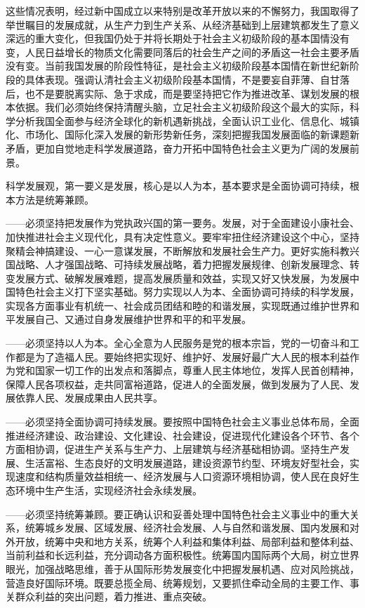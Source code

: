 这些情况表明，经过新中国成立以来特别是改革开放以来的不懈努力，我国取得了举世瞩目的发展成就，从生产力到生产关系、从经济基础到上层建筑都发生了意义深远的重大变化，但我国仍处于并将长期处于社会主义初级阶段的基本国情没有变，人民日益增长的物质文化需要同落后的社会生产之间的矛盾这一社会主要矛盾没有变。当前我国发展的阶段性特征，是社会主义初级阶段基本国情在新世纪新阶段的具体表现。强调认清社会主义初级阶段基本国情，不是要妄自菲薄、自甘落后，也不是要脱离实际、急于求成，而是要坚持把它作为推进改革、谋划发展的根本依据。我们必须始终保持清醒头脑，立足社会主义初级阶段这个最大的实际，科学分析我国全面参与经济全球化的新机遇新挑战，全面认识工业化、信息化、城镇化、市场化、国际化深入发展的新形势新任务，深刻把握我国发展面临的新课题新矛盾，更加自觉地走科学发展道路，奋力开拓中国特色社会主义更为广阔的发展前景。

科学发展观，第一要义是发展，核心是以人为本，基本要求是全面协调可持续，根本方法是统筹兼顾。

——必须坚持把发展作为党执政兴国的第一要务。发展，对于全面建设小康社会、加快推进社会主义现代化，具有决定性意义。要牢牢扭住经济建设这个中心，坚持聚精会神搞建设、一心一意谋发展，不断解放和发展社会生产力。更好实施科教兴国战略、人才强国战略、可持续发展战略，着力把握发展规律、创新发展理念、转变发展方式、破解发展难题，提高发展质量和效益，实现又好又快发展，为发展中国特色社会主义打下坚实基础。努力实现以人为本、全面协调可持续的科学发展，实现各方面事业有机统一、社会成员团结和睦的和谐发展，实现既通过维护世界和平发展自己、又通过自身发展维护世界和平的和平发展。

——必须坚持以人为本。全心全意为人民服务是党的根本宗旨，党的一切奋斗和工作都是为了造福人民。要始终把实现好、维护好、发展好最广大人民的根本利益作为党和国家一切工作的出发点和落脚点，尊重人民主体地位，发挥人民首创精神，保障人民各项权益，走共同富裕道路，促进人的全面发展，做到发展为了人民、发展依靠人民、发展成果由人民共享。

——必须坚持全面协调可持续发展。要按照中国特色社会主义事业总体布局，全面推进经济建设、政治建设、文化建设、社会建设，促进现代化建设各个环节、各个方面相协调，促进生产关系与生产力、上层建筑与经济基础相协调。坚持生产发展、生活富裕、生态良好的文明发展道路，建设资源节约型、环境友好型社会，实现速度和结构质量效益相统一、经济发展与人口资源环境相协调，使人民在良好生态环境中生产生活，实现经济社会永续发展。

——必须坚持统筹兼顾。要正确认识和妥善处理中国特色社会主义事业中的重大关系，统筹城乡发展、区域发展、经济社会发展、人与自然和谐发展、国内发展和对外开放，统筹中央和地方关系，统筹个人利益和集体利益、局部利益和整体利益、当前利益和长远利益，充分调动各方面积极性。统筹国内国际两个大局，树立世界眼光，加强战略思维，善于从国际形势发展变化中把握发展机遇、应对风险挑战，营造良好国际环境。既要总揽全局、统筹规划，又要抓住牵动全局的主要工作、事关群众利益的突出问题，着力推进、重点突破。

